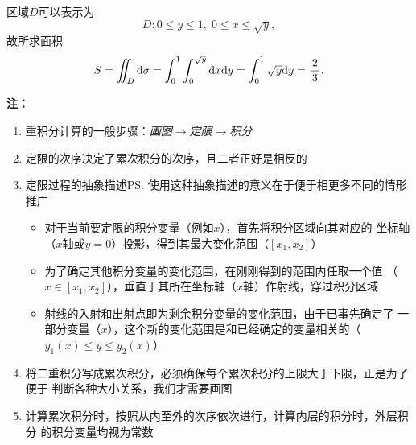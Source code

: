 \begin{center}
\end{center}

区域$D$可以表示为
$$D:0\leq y\leq 1,\;0\leq x\leq\sqrt y,$$
故所求面积
$$S=\iint_D\mathrm{d}\sigma=\displaystyle\int_0^1\displaystyle\int_0^{\sqrt y}\mathrm{d} x\mathrm{d} y
=\displaystyle\int_0^1\sqrt y\mathrm{d} y=\displaystyle\frac{\,{2}\,}{\,{3}\,}.$$

{\bf 注：}%
\begin{enumerate}[(1)]
  \setlength{\itemindent}{1cm}
  \item 重积分计算的一般步骤：{\it 画图$\to$定限$\to$积分}
  \item 定限的次序决定了累次积分的次序，且二者正好是相反的
  \item 定限过程的抽象描述\ps{使用这种抽象描述的意义在于便于相更多不同的情形推广}
  \begin{itemize}
    \item 对于当前要定限的积分变量（例如$x$），首先将积分区域向其对应的
    坐标轴（$x$轴或$y=0$）投影，得到其最大变化范围（$[x_1,x_2]$）
    \item 为了确定其他积分变量的变化范围，在刚刚得到的范围内任取一个值
    （$x\in[x_1,x_2]$），垂直于其所在坐标轴（$x$轴）作射线，穿过积分区域
    \item 射线的入射和出射点即为剩余积分变量的变化范围，由于已事先确定了
    一部分变量（$x$），这个新的变化范围是和已经确定的变量相关的（$y_1(x)
    \leq y\leq y_2(x)$）
  \end{itemize}
  \item 将二重积分写成累次积分，必须确保每个累次积分的上限大于下限，正是为了便于
  判断各种大小关系，我们才需要画图
  \item 计算累次积分时，按照从内至外的次序依次进行，计算内层的积分时，外层积分
  的积分变量均视为常数
\end{enumerate}

